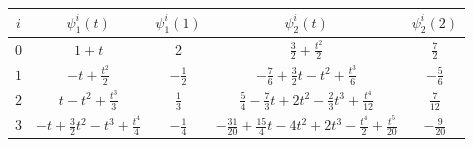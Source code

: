 \begin{exam}
\begin{center}
\begin{tabular}{|c|c|c|c|c|}


\hline \vrule height6mm width0mm depth3mm




$ i $ & $\psi_1^i(t)$ & $\psi_1^i(1)$ & $\psi_2^i(t)$ &


$\psi_2^i(2)$ \\


\hline \hline \vrule height6mm width0mm depth3mm




$0$ & $1+t$ & 2 & 


$\frac{3}{2}+\frac{t^2}{2}$ & $\frac{7}{2}$ \\


\hline \vrule height6mm width0mm depth3mm




$1$ & $-t+\frac{t^2}{2}$ & $-\frac{1}{2}$ & 


$-\frac{7}{6}+\frac{3}{2}t-t^2+\frac{t^3}{6}$ & $-\frac{5}{6}$\\


%


\hline \vrule height6mm width0mm depth3mm




$2$ & $t-t^2+\frac{t^3}{3}$ & $\frac{1}{3}$ & 


$\frac{5}{4}-\frac{7}{3}t+2t^2-\frac{2}{3}t^3+


\frac{t^4}{12}$ & $\frac{7}{12}$ \\


%


\hline \vrule height6mm width0mm depth3mm




$3$ & $-t+\frac{3}{2}t^2-t^3+\frac{t^4}{4}$ & $-\frac{1}{4}$ & 


$-\frac{31}{20}+\frac{15}{4}t-4t^2+2t^3-\frac{t^4}{2}


+\frac{t^5}{20}$ & $-\frac{9}{20}$ \\


\hline


\end{tabular}


\end{center}


\medskip





\begin{center}



\end{center}
\end{exam}
